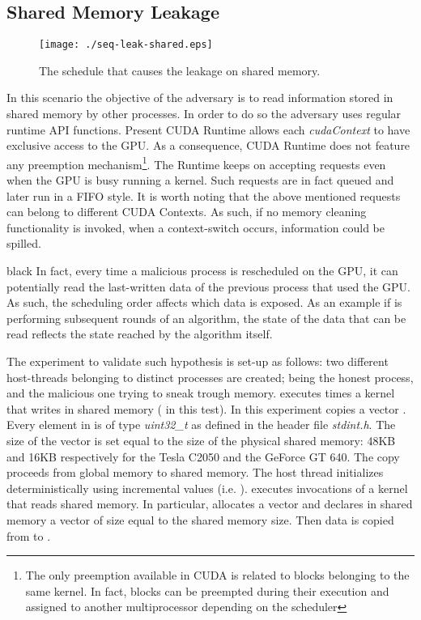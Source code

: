 \documentclass[11pt,onecolumn,letterpaper]{IEEEtran}
\newcommand{\clr}{black}
\begin{document}
\subsection{Shared Memory Leakage}
\label{sub:shmem_attack}

\begin{figure}[t]
\begin{center}
	\texttt{[image: ./seq-leak-shared.eps]}
	\caption{The schedule that causes the leakage on shared memory.}
	\label{fig:shmemmem_attack}
\end{center}
\end{figure}

In this scenario the objective of the adversary is to read information stored in shared memory by other processes.
In order to do so the adversary uses regular runtime API functions. Present CUDA Runtime allows each \emph{cudaContext} to have exclusive access to the GPU. 
As a consequence, CUDA Runtime does not feature any preemption mechanism\footnote{The only preemption available in CUDA is related to blocks belonging to the same kernel.
In fact, blocks can be preempted during their execution and assigned to another multiprocessor depending on the scheduler}.
The Runtime keeps on accepting requests even when the GPU is busy running a kernel. 
Such requests are in fact queued and later run in a FIFO style.
It is worth noting that the above mentioned requests can belong to different CUDA Contexts.
As such, if no memory cleaning functionality is invoked, when a context-switch occurs, information could be spilled.

\begin{color}{\clr}
\label{leakagequality} 
In fact, every time a malicious process is rescheduled on the GPU, 
it can potentially read the last-written data of the previous process that used the GPU. 
As such, the scheduling order affects which data is exposed.
As an example if  is performing subsequent rounds of an algorithm,
the state of the data that can be read reflects the state reached by the algorithm itself.
\end{color}

The experiment to validate such hypothesis is set-up as follows:
two different host-threads belonging to distinct processes are created;
 being the honest process, and  the malicious one trying to sneak trough  memory.
 executes  times a kernel that writes in shared memory ( in this test).
In this experiment  copies a vector .
Every element in  is of type \emph{uint32\_t} as defined in the header file \emph{stdint.h}.
The size of the vector is set equal to the size of the physical shared memory:
48KB and 16KB respectively for the Tesla C2050 and the GeForce GT 640.
The copy proceeds from global memory to shared memory. 
The host thread initializes  deterministically using incremental values (i.e. ).
 executes  invocations of a kernel that reads shared memory. 
In particular,  allocates a vector  and declares in shared memory a vector  of size equal to the shared memory size.
Then data is copied from  to .
\end{document}
